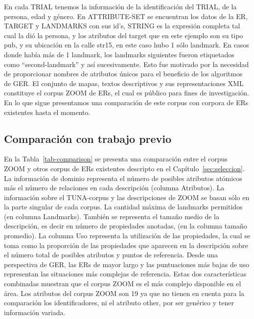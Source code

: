 

En cada TRIAL tenemos la informaci\'on de la identificaci\'on del TRIAL, de la persona, edad y g\'enero. En ATTRIBUTE-SET se encuentran los datos de la ER, TARGET y LANDMARKS con sus id's, STRING es la expresi\'on completa tal cual la di\'o la persona, y los atributos del target que en este ejemplo son su tipo pub, y su ubicaci\'on en la calle str15, en este caso hubo 1 s\'olo landmark. En casos donde hab\'ia m\'as de 1 landmark, los landmarks siguientes fueron etiquetados como ``second-landmark'' y as\'{i} sucesivamente. Esto fue motivado por la necesidad de proporcionar nombres de atributos \'unicos para el beneficio de los algoritmos de GER.
El conjunto de mapas, textos descriptivos y sus representaciones XML constituye el corpus ZOOM de ERs, el cual es p\'ublico para fines de investigaci\'on.  En lo que sigue presentamos una comparaci\'on de este corpus con corpora de ERs existentes hasta el momento. 

\subsection{Comparaci\'on con trabajo previo}
\label{sec:comparacion_trabajo_previo}

En la Tabla~\ref{tab-comparison} se presenta una comparaci\'on entre el corpus ZOOM y otros corpus de ERs existentes descripto en el Cap\'itulo~\ref{sec:seleccion}. La informaci\'on de dominio representa el n\'umero de posibles atributos at\'omicos m\'as el n\'umero de relaciones en cada descripci\'on (columna Atributos). La informaci\'on sobre el TUNA-corpus y las descripciones de ZOOM se basan s\'olo en la parte singular de cada corpus. La cantidad m\'axima de landmarks permitidos (en columna Landmarks). Tambi\'en se representa el tama\~no medio de la descripci\'on, es decir en n\'umero de propiedades anotadas, (en la columna tama\~no promedio). La columna Uso representa la utilizaci\'on de las propiedades, la cual se toma como la proporci\'on de las propiedades que aparecen en la descripci\'on sobre el n\'umero total de posibles atributos y puntos de referencia. Desde una perspectiva de GER, las ERs de mayor largo y las puntuaciones m\'as bajas de uso representan las situaciones m\'as complejas de referencia. Estas dos caracter\'isticas combinadas muestran que el corpus ZOOM es el m\'as complejo disponible en el \'area.
Los atributos del corpus ZOOM son 19 ya que no tienen en cuenta para la comparaci\'on los identificadores, ni el atributo other, por ser gen\'erico y tener informaci\'on variada.

